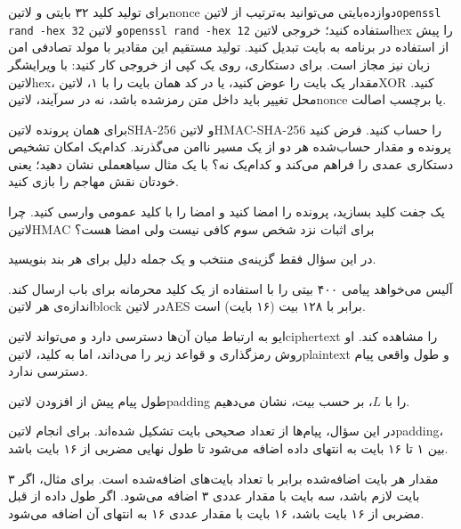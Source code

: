 \documentclass{../is-assignment}
\begin{document}
برای تولید کلید ۳۲ بایتی و ‌لاتین{nonce} دوازده‌بایتی می‌توانید به‌ترتیب از
‌لاتین{\texttt{openssl rand -hex 32}} و
‌لاتین{\texttt{openssl rand -hex 12}} استفاده کنید؛
خروجی ‌لاتین{hex} را پیش از استفاده در برنامه به بایت تبدیل کنید.
تولید مستقیم این مقادیر با مولد تصادفی امن زبان نیز مجاز است.
برای دستکاری، روی یک کپی از خروجی کار کنید: با ویرایشگر ‌لاتین{hex}،
مقدار یک بایت را عوض کنید، یا در کد همان بایت را با ۱، ‌لاتین{XOR} کنید.
محل تغییر باید داخل متن رمزشده باشد، نه در سرآیند، ‌لاتین{nonce} یا برچسب اصالت.



 برای همان پرونده ‌لاتین{SHA-256} و ‌لاتین{HMAC-SHA-256} را حساب کنید.
 فرض کنید پرونده و مقدار حساب‌شده هر دو از یک مسیر ناامن می‌گذرند.
      کدام‌یک امکان تشخیص دستکاری عمدی را فراهم می‌کند و کدام‌یک نه؟
      با یک مثال ‌سیاه{عملی} نشان دهید؛ یعنی خودتان نقش مهاجم را بازی کنید.



 یک جفت کلید بسازید، پرونده را امضا کنید و امضا را با کلید عمومی وارسی کنید.
 چرا ‌لاتین{HMAC} برای اثبات نزد شخص سوم کافی نیست ولی امضا هست؟


\newpage
{}

در این سؤال فقط گزینه‌ی منتخب و یک جمله دلیل برای هر بند بنویسید.

آلیس می‌خواهد پیامی ۴۰۰ بیتی را با استفاده از یک کلید محرمانه
برای باب ارسال کند.
اندازه‌ی هر ‌لاتین{block} در ‌لاتین{AES} برابر با
۱۲۸ بیت (۱۶ بایت) است.

ایو به ارتباط میان آن‌ها دسترسی دارد و می‌تواند
‌لاتین{ciphertext} را مشاهده کند.
او روش رمزگذاری و قواعد زیر را می‌داند، اما به کلید،
‌لاتین{plaintext} و طول واقعی پیام دسترسی ندارد.

طول پیام پیش از افزودن ‌لاتین{padding} را با $L$،
بر حسب بیت، نشان می‌دهیم.

در این سؤال، پیام‌ها از تعداد صحیحی بایت تشکیل شده‌اند.
برای انجام ‌لاتین{padding}، بین ۱ تا ۱۶ بایت به انتهای داده اضافه می‌شود
تا طول نهایی مضربی از ۱۶ بایت باشد.

مقدار هر بایت اضافه‌شده برابر با تعداد بایت‌های اضافه‌شده است.
برای مثال، اگر ۳ بایت لازم باشد، سه بایت با مقدار عددی ۳ اضافه می‌شود.
اگر طول داده از قبل مضربی از ۱۶ بایت باشد،
۱۶ بایت با مقدار عددی ۱۶ به انتهای آن اضافه می‌شود.
\end{document}
